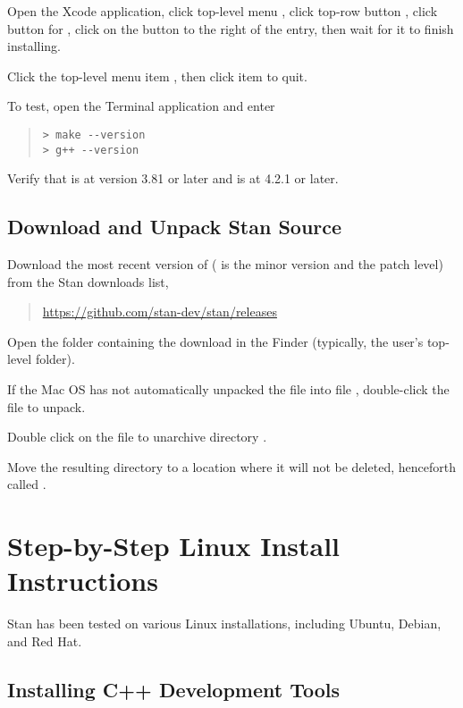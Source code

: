 Open the Xcode application, click top-level menu
, click top-row button ,
click button for , click on the 
button to the right of the  entry, then
wait for it to finish installing.  

Click the top-level menu item , then click item 
 to quit.

To test, open the Terminal application and enter

\begin{quote}
\begin{Verbatim}[fontshape=sl,fontsize=\small]
> make --version
> g++ --version
\end{Verbatim}
\end{quote}
%
Verify that  is at version 3.81 or later and 
is at 4.2.1 or later.


\subsection{Download and Unpack Stan Source}

Download the most recent version of 
( is the minor version and  the patch level) from
the Stan downloads list,
%
\begin{quote}
\url{https://github.com/stan-dev/stan/releases}
\end{quote}

Open the folder containing the download in the Finder
(typically, the user's top-level  folder).

If the Mac OS has not automatically unpacked the 
file into file ,
double-click the  file to unpack.

Double click on the  file to unarchive
directory .

Move the resulting directory to a location where it will not be
deleted, henceforth called .


\section{Step-by-Step Linux Install Instructions}

Stan has been tested on various Linux installations, including
Ubuntu, Debian, and Red Hat.

\subsection{Installing C++ Development Tools}


